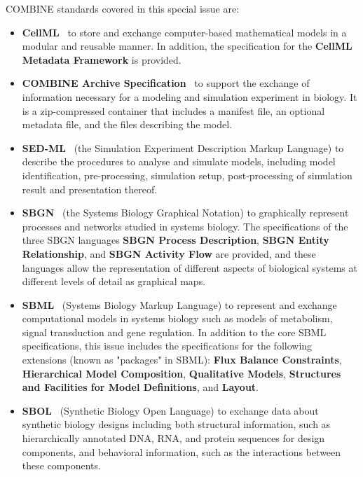 \documentclass{jib}
\begin{document}
COMBINE standards covered in this special issue are:
\begin{itemize}
\item {\bf CellML}~\cite{cuellar2003overview} to store and exchange computer-based mathematical models in a modular and reusable manner. 
In addition, the specification for the {\bf CellML Metadata Framework} is provided.

\item {\bf COMBINE Archive Specification}~\cite{Bergmann2014combine} to support the exchange of information necessary for a modeling and simulation experiment in biology. 
It is a zip-compressed container that includes a manifest file, an optional metadata file, and the files describing the model. 

\item {\bf SED-ML}~\cite{sedml2011} (the Simulation Experiment Description Markup Language) to describe the procedures to analyse and simulate  models, including model identification, pre-processing, simulation setup, post-processing of simulation result and presentation thereof.

\item {\bf SBGN}~\cite{le2009systems} (the Systems Biology Graphical Notation) to graphically represent processes and networks studied in systems biology. 
The specifications of the three SBGN languages {\bf SBGN Process Description}, {\bf SBGN Entity Relationship}, and {\bf SBGN Activity Flow} are provided, and these languages allow the representation of different aspects of biological systems at different levels of detail as  graphical maps.

\item {\bf SBML}~\cite{hucka2003} (Systems Biology Markup Language) to represent and exchange computational models in systems biology such as models of metabolism, signal transduction and gene regulation. 
In addition to the core SBML specifications, this issue includes the specifications for the following extensions (known as "packages" in SBML):  {\bf Flux Balance Constraints}, {\bf Hierarchical Model Composition}, {\bf Qualitative Models}, {\bf Structures and Facilities for Model Definitions}, and {\bf Layout}.

\item {\bf SBOL}~\cite{galdzicki2014} (Synthetic Biology Open Language) to exchange data about synthetic biology designs including both structural information, such as hierarchically annotated DNA, RNA, and protein sequences for design components, and behavioral information, such as the interactions between these components. 
\end{itemize}
\end{document}
